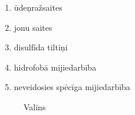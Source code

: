 \documentclass[12pt,a4paper]{article}
\begin{document}
\begin{figure}[h]
\begin{minipage}[c]{0.55\textwidth}
        \begin{enumerate}[label=\Alph*.]
            \item ūdeņražsaites
            \item jonu saites
            \item disulfīda tiltiņi
            \item hidrofobā mijiedarbība
            \item neveidosies spēcīga mijiedarbība
        \end{enumerate}
    \end{minipage}%
    \hfill
    \begin{minipage}[c]{0.40\textwidth}
        \centering
        \begin{subfigure}[c]{0.48\textwidth}
            \caption{Valīns}
            \label{fig:valins}
        \end{subfigure}%
        \hfill
        \begin{subfigure}[c]{0.48\textwidth}

\end{subfigure}
\end{minipage}
\end{figure}
\end{document}

